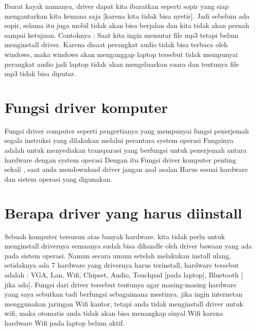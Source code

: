 Ibarat kayak  namanya, driver dapat kita ibaratkan seperti sopir yang siap mengantarkan kita kemana saja [karena kita tidak bisa nyetir].
Jadi sebelum ada sopir, selama itu juga mobil tidak akan bisa berjalan dan kita tidak akan pernah sampai ketujuan.
Contohnya  : Saat kita ingin memutar file mp3 tetapi belum menginstall driver.
Karena disaat perangkat audio tidak bisa terbaca oleh windows, maka windows akan menganggap laptop tersebut tidak mempunyai perangkat audio jadi laptop tidak akan mengeluarkan suara dan tentunya file mp3 tidak bisa diputar.

\section{Fungsi driver komputer}
Fungsi driver computer seperti pengertianya yang mempunyai fungsi penerjemah segala instruksi yang dilakukan melalui perantara system operasi
Fungsinya adalah untuk menyediakan transparasi yang berfungsi untuk penerjemah antara hardware dengan system operasi 
Dengan itu Fungsi driver komputer penting sekali , saat anda mendownload driver jangan asal asalan
Harus sesuai hardware dan sistem operasi yang digunakan.

\section{Berapa driver yang harus diinstall}

Sebuah komputer tersusun atas banyak hardware.  kita tidak perlu untuk menginstall drivernya  semuanya
sudah bisa dihandle oleh driver bawaan yang ada pada sistem operasi.
Namun secara umum setelah melakukan install ulang, setidaknya ada 7 hardware yang drivernya harus terinstall, hardware tersebut adalah : VGA, Lan, Wifi, Chipset, Audio, Touchpad [pada laptop], Bluetooth [ jika ada].
Fungsi dari driver tersebut tentunya agar masing-masing hardware yang saya sebutkan tadi berfungsi sebagaimana mestinya.
jika ingin internetan menggunakan jaringan Wifi kantor, tetapi anda tidak menginstall driver untuk wifi, maka otomatis anda tidak akan bisa menangkap sinyal Wifi karena hardware Wifi pada laptop belum aktif.

